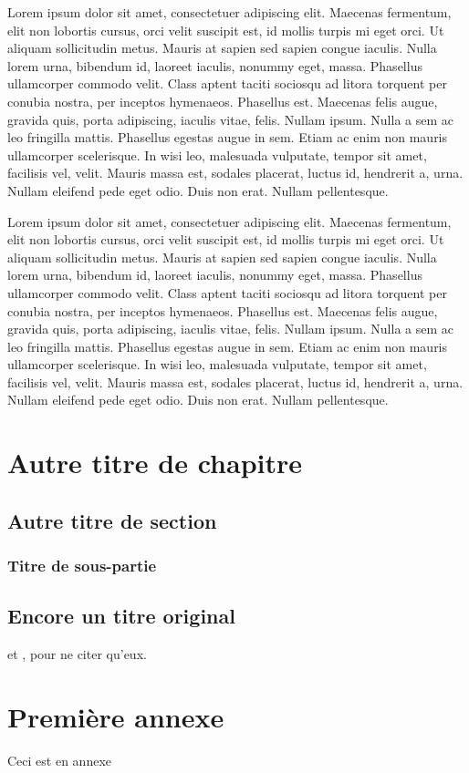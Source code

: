 \documentclass[oneside,12pt,a4paper]{book}
\begin{document}
Lorem ipsum dolor sit amet, consectetuer adipiscing elit. Maecenas fermentum, elit non lobortis cursus, orci velit suscipit est, id mollis turpis mi eget orci. Ut aliquam sollicitudin metus. Mauris at sapien sed sapien congue iaculis. Nulla lorem urna, bibendum id, laoreet iaculis, nonummy eget, massa. Phasellus ullamcorper commodo velit. Class aptent taciti sociosqu ad litora torquent per conubia nostra, per inceptos hymenaeos. Phasellus est. Maecenas felis augue, gravida quis, porta adipiscing, iaculis vitae, felis. Nullam ipsum. Nulla a sem ac leo fringilla mattis. Phasellus egestas augue in sem. Etiam ac enim non mauris ullamcorper scelerisque. In wisi leo, malesuada vulputate, tempor sit amet, facilisis vel, velit. Mauris massa est, sodales placerat, luctus id, hendrerit a, urna. Nullam eleifend pede eget odio. Duis non erat. Nullam pellentesque.

Lorem ipsum dolor sit amet, consectetuer adipiscing elit. Maecenas fermentum, elit non lobortis cursus, orci velit suscipit est, id mollis turpis mi eget orci. Ut aliquam sollicitudin metus. Mauris at sapien sed sapien congue iaculis. Nulla lorem urna, bibendum id, laoreet iaculis, nonummy eget, massa. Phasellus ullamcorper commodo velit. Class aptent taciti sociosqu ad litora torquent per conubia nostra, per inceptos hymenaeos. Phasellus est. Maecenas felis augue, gravida quis, porta adipiscing, iaculis vitae, felis. Nullam ipsum. Nulla a sem ac leo fringilla mattis. Phasellus egestas augue in sem. Etiam ac enim non mauris ullamcorper scelerisque. In wisi leo, malesuada vulputate, tempor sit amet, facilisis vel, velit. Mauris massa est, sodales placerat, luctus id, hendrerit a, urna. Nullam eleifend pede eget odio. Duis non erat. Nullam pellentesque.

\chapter{Autre titre de chapitre}



\section{Autre titre de section}
\subsection{Titre de sous-partie}
\section{Encore un titre original}
\cite{Simon1903} et \cite{Kohler1903}, pour ne citer qu'eux.

\newpage
{}
\pagestyle{plain}
\thispagestyle{plain}
\pagestyle{fancy}

\appendix
\chapter{Première annexe}
\setcounter{page}{1}

Ceci est en annexe
\end{document}
